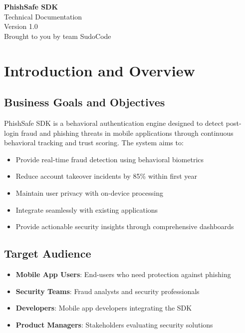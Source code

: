 \documentclass[11pt]{article}
\begin{document}
\vspace*{3cm}
\begin{center}
    {\Huge \textbf{PhishSafe SDK}}\\[1.2em]
    {\LARGE Technical Documentation}\\[1em]
    {\large Version 1.0}\\[0.5em]
    {\small Brought to you by team SudoCode}
\end{center}
\vfill

\newpage
\tableofcontents

\clearpage
\section{Introduction and Overview}

\subsection{Business Goals and Objectives}
PhishSafe SDK is a behavioral authentication engine designed to detect post-login fraud and phishing threats in mobile applications through continuous behavioral tracking and trust scoring. The system aims to:

\begin{itemize}
    \item Provide real-time fraud detection using behavioral biometrics
    \item Reduce account takeover incidents by 85\% within first year
    \item Maintain user privacy with on-device processing
    \item Integrate seamlessly with existing applications
    \item Provide actionable security insights through comprehensive dashboards
\end{itemize}

\subsection{Target Audience}
\begin{itemize}
    \item \textbf{Mobile App Users}: End-users who need protection against phishing
    \item \textbf{Security Teams}: Fraud analysts and security professionals
    \item \textbf{Developers}: Mobile app developers integrating the SDK
    \item \textbf{Product Managers}: Stakeholders evaluating security solutions
\end{itemize}
\end{document}
